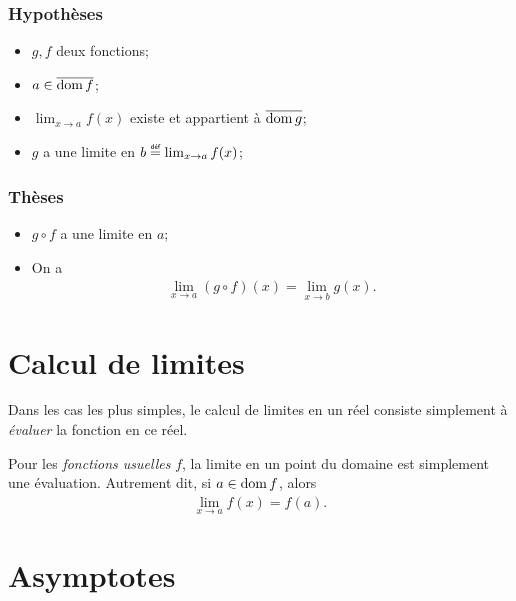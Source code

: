 \documentclass[main.tex]{subfiles}
\begin{document}
\begin{proposition}

    \subsubsection{Hypothèses}
    \begin{itemize}
        \item $g, f$ deux fonctions;
        \item $a \in \overline{\operatorname{dom} f}$;
        \item $\lim_{x \to a} f(x)$ existe et appartient à $\overline{\operatorname{dom} g}$;
        \item $g$ a une limite en $b \defeq \lim_{x \to a} f(x)$;
    \end{itemize}

    \subsubsection{Thèses}
    \begin{itemize}
        \item $g \circ f$ a une limite en $a$;
        \item On a
            \begin{align}
                \lim_{x \to a} (g \circ f)(x) = \lim_{x \to b} g(x).
            \end{align}
    \end{itemize}
\end{proposition}

\section{Calcul de limites}

Dans les cas les plus simples,
le calcul de limites en un réel consiste simplement à \emph{évaluer} la fonction en ce réel.

\begin{proposition}
    Pour les \emph{fonctions usuelles} $f$,
    la limite en un point du domaine est simplement une évaluation.
    Autrement dit,
    si $a \in \operatorname{dom} f$, alors
    \begin{align}
        \lim_{x \to a} f(x) = f(a).
    \end{align}
\end{proposition}

\section{Asymptotes}
\end{document}

